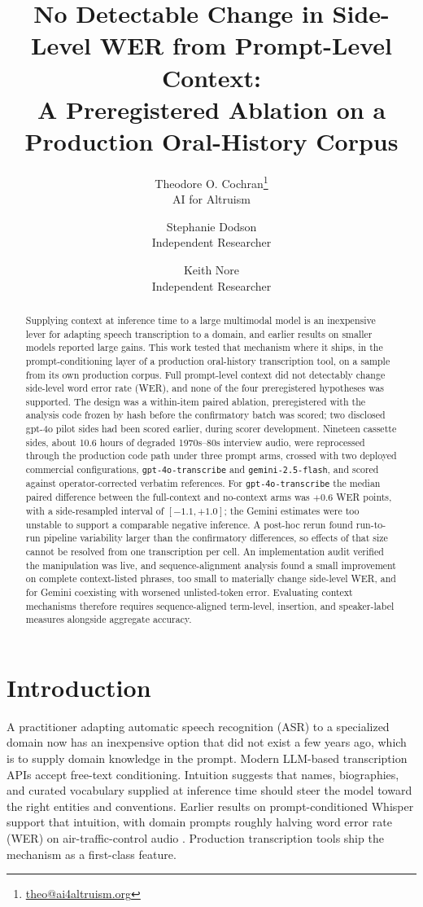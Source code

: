 \documentclass[11pt]{article}
\title{\bfseries No Detectable Change in Side-Level WER from Prompt-Level Context:\\ A Preregistered Ablation on a Production Oral-History Corpus}
\author{
  Theodore O. Cochran\thanks{\href{mailto:theo@ai4altruism.org}{theo@ai4altruism.org}}\\ \small AI for Altruism
  \and Stephanie Dodson\\ \small Independent Researcher
  \and Keith Nore\\ \small Independent Researcher
}
\date{}
\begin{document}
\maketitle

\begin{abstract}
Supplying context at inference time to a large multimodal model is an inexpensive lever for adapting speech transcription to a domain, and earlier results on smaller models reported large gains. This work tested that mechanism where it ships, in the prompt-conditioning layer of a production oral-history transcription tool, on a sample from its own production corpus. Full prompt-level context did not detectably change side-level word error rate (WER), and none of the four preregistered hypotheses was supported. The design was a within-item paired ablation, preregistered with the analysis code frozen by hash before the confirmatory batch was scored; two disclosed gpt-4o pilot sides had been scored earlier, during scorer development. Nineteen cassette sides, about 10.6 hours of degraded 1970s--80s interview audio, were reprocessed through the production code path under three prompt arms, crossed with two deployed commercial configurations, \texttt{gpt-4o-transcribe} and \texttt{gemini-2.5-flash}, and scored against operator-corrected verbatim references. For \texttt{gpt-4o-transcribe} the median paired difference between the full-context and no-context arms was $+0.6$ WER points, with a side-resampled interval of $[-1.1, +1.0]$; the Gemini estimates were too unstable to support a comparable negative inference. A post-hoc rerun found run-to-run pipeline variability larger than the confirmatory differences, so effects of that size cannot be resolved from one transcription per cell. An implementation audit verified the manipulation was live, and sequence-alignment analysis found a small improvement on complete context-listed phrases, too small to materially change side-level WER, and for Gemini coexisting with worsened unlisted-token error. Evaluating context mechanisms therefore requires sequence-aligned term-level, insertion, and speaker-label measures alongside aggregate accuracy.
\end{abstract}

\section{Introduction}

A practitioner adapting automatic speech recognition (ASR) to a specialized domain now has an inexpensive option that did not exist a few years ago, which is to supply domain knowledge in the prompt. Modern LLM-based transcription APIs accept free-text conditioning. Intuition suggests that names, biographies, and curated vocabulary supplied at inference time should steer the model toward the right entities and conventions. Earlier results on prompt-conditioned Whisper support that intuition, with domain prompts roughly halving word error rate (WER) on air-traffic-control audio \citep{cochran24}. Production transcription tools ship the mechanism as a first-class feature.
\end{document}
